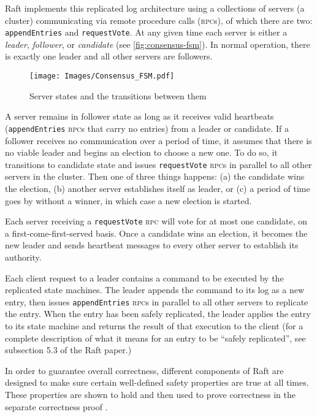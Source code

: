 \documentclass[draft,11pt,chapterprefix=true,toc=bibliography,numbers=noendperiod,
               footnotes=multiple,twoside]{scrreprt}
\newcommand{\requestVoteRPC}[0]{\texttt{requestVote} \textsc{rpc}}
\newcommand{\appendEntriesRPC}[0]{\texttt{appendEntries} \textsc{rpc}}
\begin{document}
Raft implements this replicated log architecture using a collections of servers (a cluster) communicating via remote procedure calls (\textsc{rpc}s), of which there are two: \texttt{appendEntries} and \texttt{requestVote}. At any given time each server is either a \emph{leader}, \emph{follower}, or \emph{candidate} (see \autoref{fig:consensus-fsm}). In normal operation, there is exactly one leader and all other servers are followers.

\begin{figure}[h]
    \centering
    \texttt{[image: Images/Consensus\_FSM.pdf]}
    \caption{Server states and the transitions between them}
    \label{fig:consensus-fsm}
\end{figure}


A server remains in follower state as long as it receives valid heartbeats (\appendEntriesRPC s that carry no entries) from a leader or candidate. If a follower receives no communication over a period of time, it assumes that there is no viable leader and begins an election to choose a new one. To do so, it transitions to candidate state and issues \requestVoteRPC s in parallel to all other servers in the cluster. Then one of three things happens: (a) the candidate wins the election, (b) another server establishes itself as leader, or (c) a period of time goes by without a winner, in which case a new election is started.

Each server receiving a \requestVoteRPC{} will vote for at most one candidate, on a first-come-first-served basis. Once a candidate wins an election, it becomes the new leader and sends heartbeat messages to every other server to establish its authority.


Each client request to a leader contains a command to be executed by the replicated state machines. The leader appends the command to its log as a new entry, then issues \appendEntriesRPC s in parallel to all other servers to replicate the entry. When the entry has been safely replicated, the leader applies the entry to its state machine and returns the result of that execution to the client (for a complete description of what it means for an entry to be \enquote{safely replicated}, see subsection 5.3 of the Raft paper.)


In order to guarantee overall correctness, different components of Raft are designed to make sure certain well-defined safety properties are true at all times. These properties are shown to hold and then used to prove correctness in the separate correctness proof \autocite{raftproof}.
\end{document}

